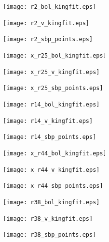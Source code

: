 \documentclass[12pt,preprint]{aastex}
\begin{document}
\begin{figure}
	\centering

	\begin{subfigure}[b]{0.3\textwidth}
		\texttt{[image: r2\_bol\_kingfit.eps]}	
	\end{subfigure}
	\begin{subfigure}[b]{0.3\textwidth}
		\texttt{[image: r2\_v\_kingfit.eps]}	
	\end{subfigure}
	\begin{subfigure}[b]{0.3\textwidth}
		\texttt{[image: r2\_sbp\_points.eps]}	
	\end{subfigure}


	\begin{subfigure}[b]{0.3\textwidth}
		\texttt{[image: x\_r25\_bol\_kingfit.eps]}	
	\end{subfigure}
	\begin{subfigure}[b]{0.3\textwidth}
		\texttt{[image: x\_r25\_v\_kingfit.eps]}	
	\end{subfigure}
	\begin{subfigure}[b]{0.3\textwidth}
		\texttt{[image: x\_r25\_sbp\_points.eps]}	
	\end{subfigure}

	
	\begin{subfigure}[b]{0.3\textwidth}
		\texttt{[image: r14\_bol\_kingfit.eps]}	
	\end{subfigure}
	\begin{subfigure}[b]{0.3\textwidth}
		\texttt{[image: r14\_v\_kingfit.eps]}	
	\end{subfigure}
	\begin{subfigure}[b]{0.3\textwidth}
		\texttt{[image: r14\_sbp\_points.eps]}	
	\end{subfigure}

	\begin{subfigure}[b]{0.3\textwidth}
		\texttt{[image: x\_r44\_bol\_kingfit.eps]}	
	\end{subfigure}
	\begin{subfigure}[b]{0.3\textwidth}
		\texttt{[image: x\_r44\_v\_kingfit.eps]}	
	\end{subfigure}
	\begin{subfigure}[b]{0.3\textwidth}
		\texttt{[image: x\_r44\_sbp\_points.eps]}	
	\end{subfigure}	


	\begin{subfigure}[b]{0.3\textwidth}
		\texttt{[image: r38\_bol\_kingfit.eps]}	
	\end{subfigure}
	\begin{subfigure}[b]{0.3\textwidth}
		\texttt{[image: r38\_v\_kingfit.eps]}	
	\end{subfigure}
	\begin{subfigure}[b]{0.3\textwidth}
		\texttt{[image: r38\_sbp\_points.eps]}	
	\end{subfigure}
	

\end{figure}
\end{document}
